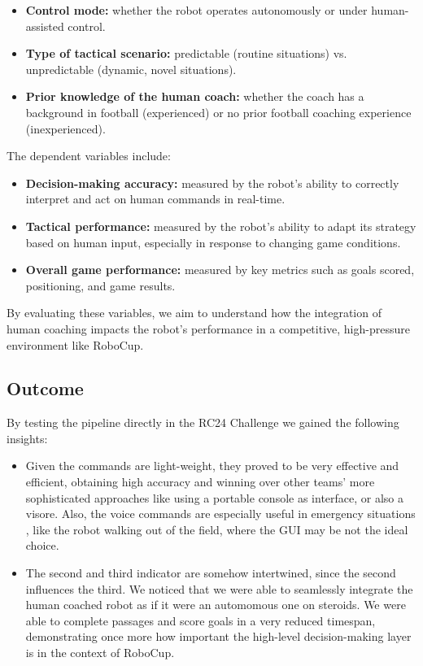 \documentclass[a4paper, onecolumn, 12pt]{article}
\begin{document}
\begin{itemize}
    \item \textbf{Control mode:} whether the robot operates autonomously or under human-assisted control.
    \item \textbf{Type of tactical scenario:} predictable (routine situations) vs. unpredictable (dynamic, novel situations).
    \item \textbf{Prior knowledge of the human coach:} whether the coach has a background in football (experienced) or no prior football coaching experience (inexperienced).
\end{itemize}

The dependent variables include:

\begin{itemize}
    \item \textbf{Decision-making accuracy:} measured by the robot's ability to correctly interpret and act on human commands in real-time.
    \item \textbf{Tactical performance:} measured by the robot's ability to adapt its strategy based on human input, especially in response to changing game conditions.
    \item \textbf{Overall game performance:} measured by key metrics such as goals scored, positioning, and game results.
\end{itemize}

By evaluating these variables, we aim to understand how the integration of human coaching impacts the robot’s performance in a competitive, high-pressure environment like RoboCup.

\subsection{Outcome}

By testing the pipeline directly in the RC24 Challenge we gained the following insights:
\begin{itemize}
    \item Given the commands are light-weight, they proved to be very effective and efficient, obtaining high accuracy and winning over other teams' more sophisticated approaches like using a portable console as interface, or also a visore. Also, the voice commands are especially useful in emergency situations , like the robot walking out of the field, where the GUI may be not the ideal choice. 
    \item The second and third indicator are somehow intertwined, since the second influences the third. We noticed that we were able to seamlessly integrate the human coached robot as if it were an automomous one on steroids. We were able to complete passages and score goals in a very reduced timespan, demonstrating once more how important the high-level decision-making layer is in the context of RoboCup.
\end{itemize}
\end{document}
